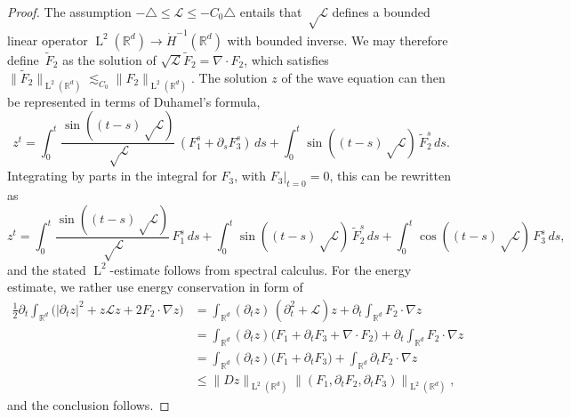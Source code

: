 \documentclass[JEP,XML,SOM,Unicode,published]{cedram}
\theoremstyle{plain}
\theoremstyle{definition}
\numberwithin{equation}{section}
\newcommand{\Lc}{\mathcal{L}}
\newcommand{\R}{\mathbb R}
\newcommand{\Ld}{\operatorname{L}}
\begin{document}
\begin{proof}
The assumption $-\triangle\le\Lc\le-C_0\triangle$ entails that $\sqrt\Lc$ defines a bounded linear operator $\Ld^2(\R^d)\to\dot H^{-1}(\R^d)$ with bounded inverse. We may therefore define~$\tilde F_2$ as the solution of $\sqrt{\Lc} \tilde F_2=\nabla\cdot F_2$, which satisfies $\|\tilde F_2\|_{\Ld^2(\R^d)}\lesssim_{C_0}\|F_2\|_{\Ld^2(\R^d)}$.
The solution $z$ of the wave equation can then be represented in terms of Duhamel's formula,
\[z^t=\int_0^t\frac{\sin((t-s)\sqrt\Lc)}{\sqrt\Lc}\,(F_1^s+\partial_s F_3^s)\,ds+\int_0^t\sin((t-s)\sqrt\Lc)\,\tilde F_2^s\,ds.\]
Integrating by parts in the integral for $F_3$, with $F_3|_{t=0}=0$, this can be rewritten as
\[z^t=\int_0^t\frac{\sin((t-s)\sqrt\Lc)}{\sqrt\Lc}\,F_1^s\,ds+\int_0^t\sin((t-s)\sqrt\Lc)\,\tilde F_2^s\,ds+\int_0^t\cos((t-s)\sqrt\Lc)\,F_3^s\,ds,\]
and the stated $\Ld^2$-estimate follows from spectral calculus.
For the energy estimate, we rather use energy conservation in form of
\begin{align*}
\tfrac12\partial_t\int_{\R^d}\big(|\partial_tz|^2+z\Lc z+2F_2\cdot\nabla z\big)
&=\int_{\R^d} (\partial_tz)\,(\partial^2_t+\Lc)z+\partial_t\int_{\R^d}F_2\cdot\nabla z\\
&=\int_{\R^d}(\partial_tz)\big(F_1+\partial_tF_3+\nabla\cdot F_2\big)+\partial_t\int_{\R^d}F_2\cdot\nabla z\\
&=\int_{\R^d}(\partial_tz)\big(F_1+\partial_tF_3\big)+\int_{\R^d}\partial_tF_2\cdot\nabla z\\
&\le\|Dz\|_{\Ld^2(\R^d)}\|(F_1,\partial_tF_2,\partial_t F_3)\|_{\Ld^2(\R^d)},
\end{align*}
and the conclusion follows.
\end{proof}




\end{document}
